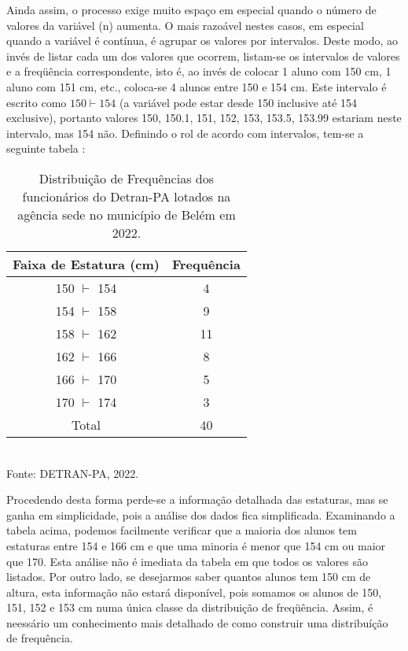 \newpage 

Ainda assim, o processo exige muito espaço em especial quando o
número de valores da variável (n) aumenta. O mais razoável nestes
casos, em especial quando a variável é contínua, é agrupar os
valores por intervalos. Deste modo, ao invés de listar cada um dos
valores que ocorrem, listam-se os intervalos de valores e a
freqüência correspondente, isto é, ao invés de colocar 1 aluno com
150 cm, 1 aluno com 151 cm, etc., coloca-se 4 alunos entre 150 e
154 cm. Este intervalo é escrito como $150 \vdash 154$ (a variável
pode estar desde 150 inclusive até 154 exclusive), portanto
valores 150, 150.1, 151, 152, 153, 153.5, 153.99 estariam neste
intervalo, mas 154 não. Definindo o rol de acordo com intervalos,
tem-se a seguinte tabela :


\newpage

\begin{table}[!htb]
    \centering
    {
    \caption{Distribuição de Frequências dos funcionários do Detran-PA lotados na agência sede no município de Belém em 2022.}
    \label{estatura2}
    \vspace{0.2cm}
\begin{tabular}{c|c}
\hline\hline
Faixa de Estatura (cm) & Frequência \\
  \hline\hline
  150 $\vdash$ 154 & 4  \\
  154 $\vdash$ 158 & 9 \\
  158 $\vdash$ 162 & 11  \\
  162 $\vdash$ 166 & 8  \\
  166 $\vdash$ 170 & 5  \\
  170 $\vdash$ 174 & 3  \\
  \hline\hline
  Total            & 40  \\
  \hline\hline
\end{tabular}}
\\
\hspace{-2.1cm}
Fonte: DETRAN-PA, 2022.
\end{table}



Procedendo desta forma perde-se a informação detalhada das
estaturas, mas se ganha em simplicidade, pois a análise dos dados
fica simplificada. Examinando a tabela acima, podemos facilmente
verificar que a maioria dos alunos tem estaturas entre 154 e 166
cm e que uma minoria é menor que 154 cm ou maior que 170. Esta
análise não é imediata da tabela em que todos os valores são
listados. Por outro lado, se desejarmos saber quantos alunos tem
150 cm de altura, esta informação não estará disponível, pois
somamos os alunos de 150, 151, 152 e 153 cm numa única classe da distribuição de freqüência. Assim, é neessário um conhecimento mais detalhado de como construir uma distribuíção de frequência.


